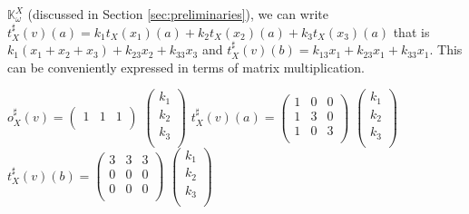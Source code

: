 \documentclass[3p]{elsarticle}
\newcommand{\cbox}[1]{\vspace{0.2cm}\noindent
  \fbox{\parbox{.97\textwidth}{#1}}\vspace{0.2cm}}
\newcommand{\K}{\mathbb{K}}            %
\newcommand{\lwa}{{\sc lwa}}           %
\begin{document}
$\K_{\omega}^X$ (discussed in Section \ref{sec:preliminaries}), we
can write $t_X^{\sharp}(v)(a)= k_1 t_X(x_1)(a)+k_2 t_X(x_2)(a) +k_3
t_X(x_3)(a)$ that is $k_1(x_1 + x_2+ x_3)+k_23x_2+k_33x_3$ and
$t_X^{\sharp}(v)(b)=k_13x_1+k_23x_1+k_33x_1$. This can be
conveniently expressed in terms of matrix multiplication.
\begin{center}
$o_X^{\sharp}(v)= \left(%
\begin{array}{ccc}
  1 & 1 & 1 \\
\end{array}\right)$
\hspace{-0.2cm}
$\left(%
\begin{array}{c}
  k_1\\
  k_2\\
  k_3\\
\end{array}\right)$
$t_X^{\sharp}(v)(a)=\left(
\begin{array}{ccc}
  1 & 0 & 0 \\
  1 & 3 & 0 \\
  1 & 0 & 3 \\
\end{array}\right)$
\hspace{-0.2cm} $\left(
\begin{array}{c}
k_1\\
k_2\\
k_3\\
\end{array}
\right)$
$t_{X}^{\sharp}(v)(b)=\left(%
\begin{array}{ccc}
  3 & 3 & 3 \\
  0 & 0 & 0 \\
  0 & 0 & 0 \\
\end{array}\right)$
\hspace{-0.2cm} $\left(
\begin{array}{c}
k_1\\
k_2\\
k_3\\
\end{array}
\right)$
%
\end{center}


%
\end{document}
